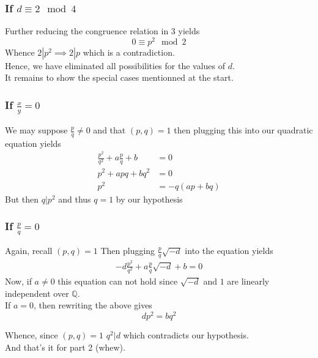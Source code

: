 \documentclass[11pt, a4paper]{article}
\begin{document}
\subsubsection*{If $d\equiv 2\mod 4$ }
Further reducing the congruence relation in 3 yields
\[ 
0 \equiv p^{2} \mod 2
\]
Whence $2| p^{2} \implies 2 |p $ which is a contradiction.\\

Hence, we have eliminated all possibilities for the values of $d$.\\
It remains to show the special cases mentionned at the start.
\subsubsection*{If $\frac{x}{y}=0$ }
We may suppose $ \frac{p}{q}\neq 0 $ and that $( p,q) =1$  then plugging this into our quadratic equation yields
\begin{align*}
	\frac{p^{2}}{q^{2}}+ a \frac{p}{q}+b &=0\\
	p^{2} + a p q +b q^{2} &= 0\\
 	p^{2} &= - q ( ap +bq) 
\end{align*}
But then $q | p^{2}$ and thus $q=1$ by our hypothesis
\subsubsection*{If $ \frac{p}{q}= 0$ }
Again, recall $( p,q) =1$ 
Then plugging $ \frac{p}{q} \sqrt{-d} $ into the equation yields
\begin{align*}
-d\frac{p^{2}}{q^{2}} + a \frac{p}{q} \sqrt{-d}  + b =0
\end{align*}
Now, if $a\neq 0$ this equation can not hold since $ \sqrt{-d} $ and $1$ are linearly independent over $ \mathbb{Q}$.\\
If $a =0$, then rewriting the above gives
\[ 
 d p^{2} = bq^{2}
\]

Whence, since $( p,q) =1$ $q^{2} |d$ which contradicts our hypothesis.\\

And that's it for part 2 (whew).
\end{document}
